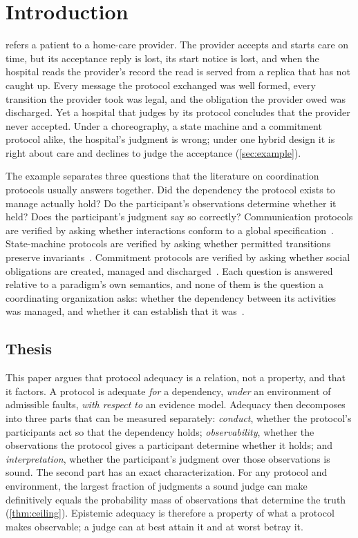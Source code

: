 \section{Introduction}
\label{sec:intro}

 refers a patient to a home-care provider. The provider accepts and starts care on time, but its acceptance reply is lost, its start notice is lost, and when the hospital reads the provider's record the read is served from a replica that has not caught up. Every message the protocol exchanged was well formed, every transition the provider took was legal, and the obligation the provider owed was discharged. Yet a hospital that judges by its protocol concludes that the provider never accepted. Under a choreography, a state machine and a commitment protocol alike, the hospital's judgment is wrong; under one hybrid design it is right about care and declines to judge the acceptance (\cref{sec:example}).

The example separates three questions that the literature on coordination protocols usually answers together. Did the dependency the protocol exists to manage actually hold? Do the participant's observations determine whether it held? Does the participant's judgment say so correctly? Communication protocols are verified by asking whether interactions conform to a global specification~\cite{honda2016mpst,scalas2019less}. State-machine protocols are verified by asking whether permitted transitions preserve invariants~\cite{harel1987statecharts,lynch1989ioa}. Commitment protocols are verified by asking whether social obligations are created, managed and discharged~\cite{singh1999ontology,yolum2002flexible}. Each question is answered relative to a paradigm's own semantics, and none of them is the question a coordinating organization asks: whether the dependency between its activities was managed, and whether it can establish that it was~\cite{malone1994interdisciplinary}.

\subsection{Thesis}

This paper argues that protocol adequacy is a relation, not a property, and that it factors. A protocol is adequate \emph{for} a dependency, \emph{under} an environment of admissible faults, \emph{with respect to} an evidence model. Adequacy then decomposes into three parts that can be measured separately: \emph{conduct}, whether the protocol's participants act so that the dependency holds; \emph{observability}, whether the observations the protocol gives a participant determine whether it holds; and \emph{interpretation}, whether the participant's judgment over those observations is sound. The second part has an exact characterization. For any protocol and environment, the largest fraction of judgments a sound judge can make definitively equals the probability mass of observations that determine the truth (\cref{thm:ceiling}). Epistemic adequacy is therefore a property of what a protocol makes observable; a judge can at best attain it and at worst betray it.

